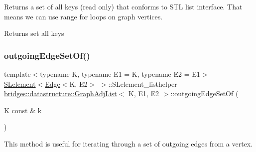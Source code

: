 Returns a set of all keys (read only) that conforms to S\+TL list interface. That means we can use range for loops on graph vertices.

\begin{DoxyReturn}{Returns}
set all keys 
\end{DoxyReturn}
\mbox{\label{classbridges_1_1datastructure_1_1_graph_adj_list_ac066da800ab88dc2e55a89650e08bb78}} 
\subsubsection{\texorpdfstring{outgoing\+Edge\+Set\+Of()}{outgoingEdgeSetOf()}\hspace{0.1cm}{\footnotesize\ttfamily [1/2]}}
{\footnotesize\ttfamily template$<$typename K, typename E1 = K, typename E2 = E1$>$ \\
\hyperlink{classbridges_1_1datastructure_1_1_s_lelement}{S\+Lelement}$<$\hyperlink{classbridges_1_1datastructure_1_1_edge}{Edge}$<$K, E2$>$ $>$\+::S\+Lelement\+\_\+listhelper \hyperlink{classbridges_1_1datastructure_1_1_graph_adj_list}{bridges\+::datastructure\+::\+Graph\+Adj\+List}$<$ K, E1, E2 $>$\+::outgoing\+Edge\+Set\+Of (\begin{DoxyParamCaption}\item[{K const \&}]{k }\end{DoxyParamCaption})\hspace{0.3cm}{\ttfamily [inline]}}



This method is useful for iterating through a set of outgoing edges from a vertex. 

\mbox{\label{classbridges_1_1datastructure_1_1_graph_adj_list_ab0677da029442194925f8167cc2b8638}} 
